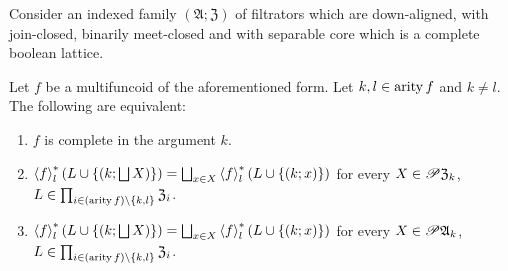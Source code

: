 \begin{thm}
\label{mfunc-compl-k}Consider an indexed family $(\mathfrak{A};\mathfrak{Z})$ of filtrators
which are down-aligned, with join-closed, binarily meet-closed and with
separable core which is a complete boolean lattice.

Let $f$ be a multifuncoid of the aforementioned form. Let $k,l\in\operatorname{arity} f$
and $k\neq l$. The following are equivalent: 
\begin{enumerate}
\item \label{pf-compl-arg}$f$ is complete in the argument $k$.
\item \label{pf-compl-princ}$\left\langle f\right\rangle ^{\ast}_{l}\left(L\cup\left\{ \left(k;\bigsqcup X\right)\right\} \right)=\bigsqcup_{x\in X}\left\langle f\right\rangle ^{\ast}_{l}(L\cup\{(k;x)\})$
for every $X\in\mathscr{P}\mathfrak{Z}_{k}$, $L\in\prod_{i\in(\operatorname{arity} f)\setminus\{k,l\}}\mathfrak{Z}_{i}$.
\item \label{pf-compl-all}$\left\langle f\right\rangle ^{\ast}_{l}\left(L\cup\left\{ \left(k;\bigsqcup X\right)\right\} \right)=\bigsqcup_{x\in X}\left\langle f\right\rangle ^{\ast}_{l}(L\cup\{(k;x)\})$
for every $X\in\mathscr{P}\mathfrak{A}_{k}$, $L\in\prod_{i\in(\operatorname{arity} f)\setminus\{k,l\}}\mathfrak{Z}_{i}$.
\end{enumerate}
\end{thm}

